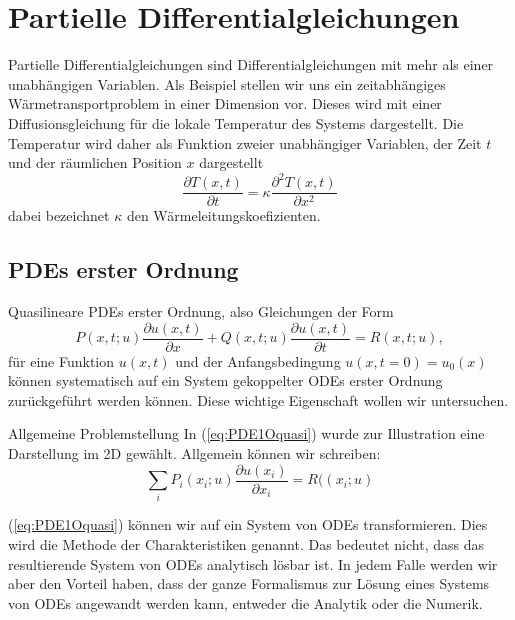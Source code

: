 \chapter{Partielle Differentialgleichungen}
Partielle Differentialgleichungen sind Differentialgleichungen mit mehr als
einer unabhängigen Variablen.  Als Beispiel stellen wir uns ein zeitabhängiges
Wärmetransportproblem in einer Dimension vor. Dieses wird mit einer
Diffusionsgleichung für die lokale Temperatur des Systems dargestellt. Die
Temperatur wird daher als Funktion zweier unabhängiger Variablen, der Zeit $t$
und der räumlichen Position $x$ dargestellt
\[\frac{\partial T(x,t)}{\partial t}=\kappa\frac{\partial^2 T(x,t)}{\partial x^2}\]
dabei bezeichnet $\kappa$ den Wärmeleitungskoefizienten.
\section{PDEs erster Ordnung}
Quasilineare PDEs erster Ordnung, also Gleichungen der Form
\begin{equation}
   P(x,t;u)\frac{\partial u(x,t)}{\partial x}+
Q(x,t;u)\frac{\partial u(x,t)}{\partial t}=
R(x,t;u), \label{eq:PDE1Oquasi}
\end{equation}
für eine Funktion $u(x,t)$ und der Anfangsbedingung $u(x,t=0)=u_0(x)$ können systematisch auf ein System gekoppelter ODEs erster Ordnung zurückgeführt werden können. Diese wichtige Eigenschaft wollen wir untersuchen.
\begin{note}{Allgemeine Problemstellung}
In (\ref{eq:PDE1Oquasi}) wurde zur Illustration eine Darstellung im 2D gewählt. Allgemein können wir schreiben:
\[
\sum\limits_i P_i(x_i;u)\frac{\partial u(x_i)}{\partial x_i}=
R((x_i;u)
\]
\end{note}
(\ref{eq:PDE1Oquasi}) können wir auf ein System von ODEs transformieren. Dies wird die Methode der Charakteristiken genannt. Das bedeutet nicht, dass das resultierende System von ODEs analytisch lösbar ist. In jedem Falle werden wir aber den Vorteil haben, dass der ganze Formalismus zur Lösung eines Systems von ODEs angewandt werden kann, entweder die Analytik oder die Numerik.

